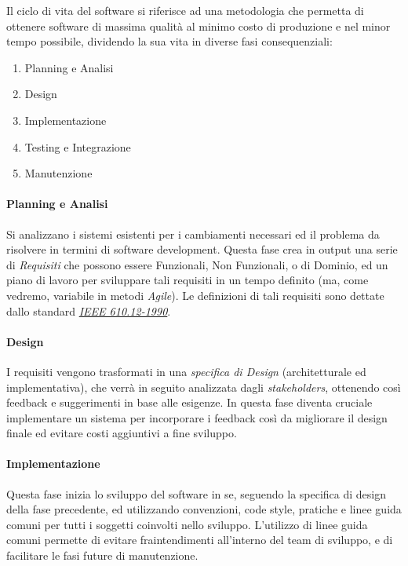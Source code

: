 \documentclass[a4paper,12pt]{report}
\begin{document}
				Il ciclo di vita del software si riferisce ad una metodologia che permetta di ottenere software di massima qualità
				al minimo costo di produzione e nel minor tempo possibile, dividendo la sua vita in diverse fasi consequenziali:
				\begin{enumerate}
					\item Planning e Analisi
					\item Design
					\item Implementazione
					\item Testing e Integrazione
					\item Manutenzione
				\end{enumerate}
				
				\paragraph{Planning e Analisi}
				Si analizzano i sistemi esistenti per i cambiamenti necessari ed il problema da risolvere in termini di software development.
				Questa fase crea in output una serie di \emph{Requisiti} che possono essere Funzionali, Non Funzionali, o di Dominio, ed un piano
				di lavoro per sviluppare tali requisiti in un tempo definito (ma, come vedremo, variabile in metodi \emph{Agile}).
				Le definizioni di tali requisiti sono dettate dallo standard \href{https://standards.ieee.org/standard/610_12-1990.html}{\emph{IEEE 610.12-1990}}.
				
				\paragraph{Design}
				I requisiti vengono trasformati in una \emph{specifica di Design} (architetturale ed implementativa), che verrà in seguito analizzata
				dagli \emph{stakeholders}, ottenendo così feedback e suggerimenti in base alle esigenze. In questa fase diventa cruciale implementare
				un sistema per incorporare i feedback così da migliorare il design finale ed evitare costi aggiuntivi a fine sviluppo.
				
				\paragraph{Implementazione}
				Questa fase inizia lo sviluppo del software in se, seguendo la specifica di design della fase precedente, ed utilizzando convenzioni,
				code style, pratiche e linee guida comuni per tutti i soggetti coinvolti nello sviluppo. L'utilizzo di linee guida comuni permette di
				evitare fraintendimenti all'interno del team di sviluppo, e di facilitare le fasi future di manutenzione.
				
\end{document}
